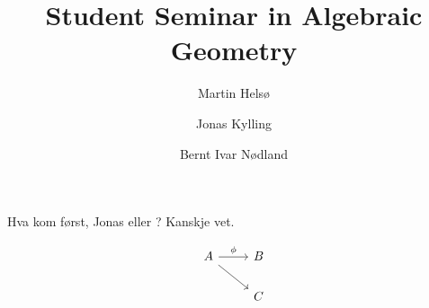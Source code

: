 \documentclass[a4paper, UKenglish]{report}
\title
{
    \bfseries\sffamily
    Student Seminar in Algebraic Geometry
}
\author
{
    Martin Hels\o
    \and
    Jonas Kylling
    \and 
    Bernt Ivar N\o dland
}
\begin{document}
\begin{titlepage}
    \maketitle
\end{titlepage}

\noindent Hva kom først, Jonas eller \kern-7pt \egg ? Kanskje \cite{Huy06} vet.

\[
\begin{tikzcd}
  A \arrow[rd] \arrow [r, "\phi"] & B \\
  & C
\end{tikzcd}
\]

\clearpage
\printbibliography
\end{document}
